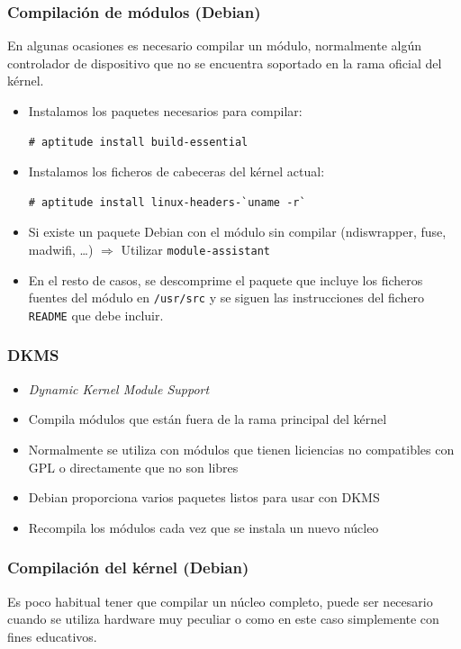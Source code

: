 \documentclass{beamer}
\begin{document}
\begin{frame}[containsverbatim]\frametitle{Compilación de módulos (Debian)}
En algunas ocasiones es necesario compilar un módulo, normalmente
algún controlador de dispositivo que no se encuentra soportado en la
rama oficial del kérnel.
\begin{itemize}
\item Instalamos los paquetes necesarios para compilar:
\begin{verbatim}
# aptitude install build-essential
\end{verbatim}
\item Instalamos los ficheros de cabeceras del kérnel actual:
\begin{verbatim}
# aptitude install linux-headers-`uname -r`
\end{verbatim}
\item Si existe un paquete Debian con el módulo sin
  compilar (ndiswrapper, fuse, madwifi, \ldots) $\Rightarrow$
  Utilizar \texttt{module-assistant}
\item En el resto de casos, se descomprime el paquete que incluye los
  ficheros fuentes del módulo en \texttt{/usr/src} y se siguen las
  instrucciones del fichero \texttt{README} que debe incluir.
\end{itemize}
\end{frame}

\begin{frame}
  \frametitle{DKMS}
  \begin{itemize}
  \item \textit{Dynamic Kernel Module Support}
  \item Compila módulos que están fuera de la rama principal del kérnel
  \item Normalmente se utiliza con módulos que tienen liciencias no
    compatibles con GPL o directamente que no son libres
  \item Debian proporciona varios paquetes listos para usar con DKMS
  \item Recompila los módulos cada vez que se instala un nuevo núcleo
  \end{itemize}
\end{frame}

\begin{frame} \frametitle{Compilación del kérnel (Debian)}
Es poco habitual tener que compilar un núcleo completo, puede ser
necesario cuando se utiliza hardware muy peculiar o como en este caso
simplemente con fines educativos.\par
\end{frame}
\end{document}

